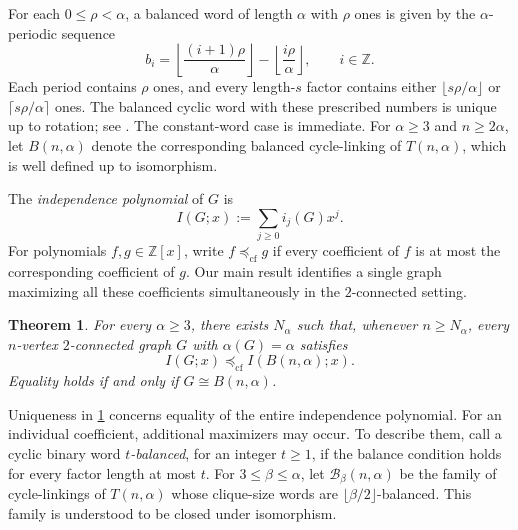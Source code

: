 \documentclass[11pt]{article}
\newtheorem{theorem}{Theorem}[section]
\theoremstyle{definition}
\newcommand{\preceqcf}{\preceq_{\mathrm{cf}}}
\begin{document}
For each $0\le\rho<\alpha$, a balanced word of length $\alpha$
with $\rho$ ones is given by the $\alpha$-periodic sequence
\begin{equation}\label{eq:mechanical-word}
 b_i=\left\lfloor\frac{(i+1)\rho}{\alpha}\right\rfloor
     -\left\lfloor\frac{i\rho}{\alpha}\right\rfloor,
 \qquad i\in\mathbb Z.
\end{equation}
Each period contains $\rho$ ones, and every length-$s$ factor
contains either $\lfloor s\rho/\alpha\rfloor$ or
$\lceil s\rho/\alpha\rceil$ ones. The balanced cyclic word with
these prescribed numbers is unique up to rotation; see
\cite[Proposition~4.4 and the preceding discussion]{DeLucaZamboni2021}.
The constant-word case is immediate. For $\alpha\ge3$ and
$n\ge2\alpha$, let $B(n,\alpha)$ denote the corresponding balanced
cycle-linking of $T(n,\alpha)$, which is well defined up to
isomorphism.

The \emph{independence polynomial} of $G$ is
\[
 I(G;x):=\sum_{j\ge0}i_j(G)x^j.
\]
For polynomials $f,g\in\mathbb Z[x]$, write $f\preceqcf g$ if every
coefficient of $f$ is at most the corresponding coefficient of $g$.
Our main result identifies a single graph maximizing all these
coefficients simultaneously in the $2$-connected setting.

\begin{theorem}\label{thm:main-coefficientwise}
For every $\alpha\ge3$, there exists $N_\alpha$ such that, whenever
$n\ge N_\alpha$, every $n$-vertex $2$-connected graph $G$ with
$\alpha(G)=\alpha$ satisfies
\[
 I(G;x)\preceqcf I(B(n,\alpha);x).
\]
Equality holds if and only if $G\cong B(n,\alpha)$.
\end{theorem}

Uniqueness in \cref{thm:main-coefficientwise} concerns equality of
the entire independence polynomial. For an individual coefficient,
additional maximizers may occur. To describe them, call a cyclic
binary word \emph{$t$-balanced}, for an integer $t\ge1$, if the
balance condition holds for every factor length at most $t$.
For $3\le\beta\le\alpha$, let $\mathcal B_\beta(n,\alpha)$ be the
family of cycle-linkings of $T(n,\alpha)$ whose clique-size words
are $\lfloor\beta/2\rfloor$-balanced. This family is understood to
be closed under isomorphism.
\end{document}
